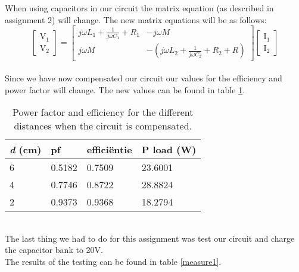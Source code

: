 \documentclass[final]{scrreprt} %
\begin{document}
When using capacitors in our circuit the matrix equation (as described in assignment 2) will change. The new matrix equations will be as follows: \\
\[\left[ {\begin{array}{*{20}{c}}
{{{\boldsymbol{\mathrm{V_1}}}}}\\
{{\boldsymbol{\mathrm{V_2}}}}

\end{array}} \right] = \left[ {\begin{array}{*{20}{c}}
{j\omega {L_{1}} + {\frac{1}{j\omega C_{1}}} + R_{1}}&{ - j\omega M}\\
{j\omega M}&{ - \left( {j\omega {L_{2}} + {\frac{1}{j\omega C_{2}}} + R_{2} + R} \right)}
\end{array}} \right]\left[ {\begin{array}{*{20}{c}}

{{\boldsymbol{\mathrm{I_1}}}}\\
{{\boldsymbol{\mathrm{I_2}}}}
\end{array}} \right]\]
\\

Since we have now compensated our circuit our values for the efficiency and power factor will change. The new values can be found in table \ref{table3}. \\

\begin{table}[h]
\begin{center}
\begin{tabular}{ l | l | l | l }
    
    \textbf{\textit{d} (cm)}            & \textbf{pf}              & \textbf{effici\"{e}ntie}  &  \textbf{P load (W)}\\	\hline
    6                           & 0.5182                     & 0.7509                & 23.6001  \\
    4                           &0.7746                  & 0.8722                     & 28.8824\\
    2                           & 0.9373                     & 0.9368                    &  18.2794 \\
\end{tabular}
\caption{Power factor and efficiency for the different distances when the circuit is compensated.}
\label{table3}
\end{center}
\end{table}
\\

The last thing we had to do for this assignment was test our circuit and charge the capacitor bank to 20V. \\ 
The results of the testing can be found in table \ref{measure1}.\\
\end{document}
